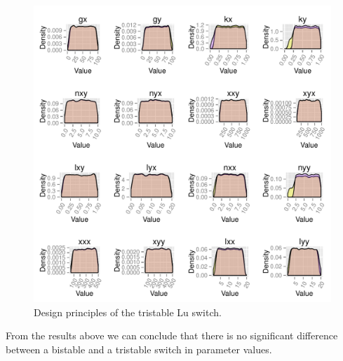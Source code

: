 \begin{figure}[h]
\centering
\includegraphics[scale=0.5]{chapterModelling/Lu_switches/images/design_principles_bi_tri.pdf}
\caption{Design principles of the tristable Lu switch.}
\label{fig:design_princip_lu}
\end{figure}

From the results above we can conclude that there is no significant difference between a bistable and a tristable switch in parameter values. 

